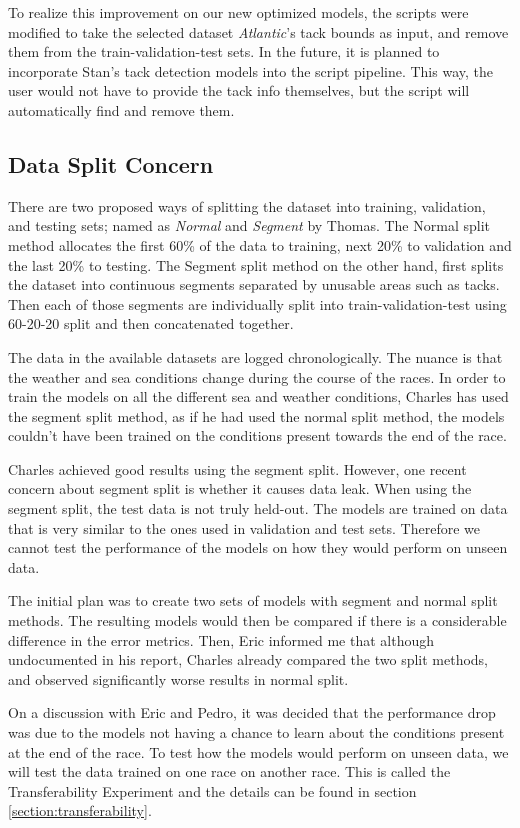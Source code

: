 \documentclass[12pt,twoside]{report}
\begin{document}
To realize this improvement on our new optimized models, the scripts were modified to take the selected dataset \textit{Atlantic}'s tack bounds as input, and remove them from the train-validation-test sets. In the future, it is planned to incorporate Stan's tack detection models into the script pipeline. This way, the user would not have to provide the tack info themselves, but the script will automatically find and remove them.

\subsection{Data Split Concern}

There are two proposed ways of splitting the dataset into training, validation, and testing sets; named as \emph{Normal} and \emph{Segment} by Thomas. The Normal split method allocates the first 60\% of the data to training, next 20\% to validation and the last 20\% to testing. The Segment split method on the other hand, first splits the dataset into continuous segments separated by unusable areas such as tacks. Then each of those segments are individually split into train-validation-test using 60-20-20 split and then concatenated together.

The data in the available datasets are logged chronologically. The nuance is that the weather and sea conditions change during the course of the races. In order to train the models on all the different sea and weather conditions, Charles has used the segment split method, as if he had used the normal split method, the models couldn't have been trained on the conditions present towards the end of the race.

Charles achieved good results using the segment split. However, one recent concern about segment split is whether it causes data leak. When using the segment split, the test data is not truly held-out. The models are trained on data that is very similar to the ones used in validation and test sets. Therefore we cannot test the performance of the models on how they would perform on unseen data.

The initial plan was to create two sets of models with segment and normal split methods. The resulting models would then be compared if there is a considerable difference in the error metrics. Then, Eric informed me that although undocumented in his report, Charles already compared the two split methods, and observed significantly worse results in normal split.

On a discussion with Eric and Pedro, it was decided that the performance drop was due to the models not having a chance to learn about the conditions present at the end of the race. To test how the models would perform on unseen data, we will test the data trained on one race on another race. This is called the Transferability Experiment and the details can be found in section \ref{section:transferability}.
\end{document}

